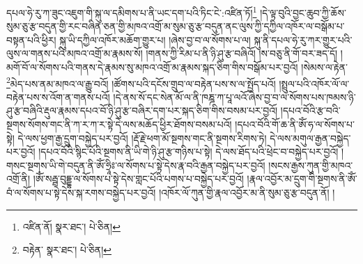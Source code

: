 དཔལ་ཧེ་རུ་ཀ་ཟུང་འཇུག་གི་སྐུ་ལ་དམིགས་པ་ནི་ཡང་དག་པའི་ཏིང་ངེ་:འཛིན་ཏོ།\footnote{འཛིན་ནོ།  སྣར་ཐང་།  པེ་ཅིན། } །དེ་ལྟ་བུའི་བྱང་ཆུབ་ཀྱི་ཆོས་སུམ་ཅུ་རྩ་བདུན་གྱི་རང་བཞིན་ཅན་གྱི་མཁའ་འགྲོ་མ་སུམ་ཅུ་རྩ་བདུན་ནང་ལུས་ཀྱི་དཀྱིལ་འཁོར་ལ་བསྒོམ་པ་བསྟན་པའི་ཕྱིར། སྐུ་ཡི་དཀྱིལ་འཁོར་མཆོག་གྱུར་པ། །ཞེས་བྱ་བ་ལ་སོགས་པ་ལ། སྐུ་ནི་དཔལ་ཧེ་རུ་ཀར་གྱུར་པའི་ལུས་ལ་གནས་པའི་མཁའ་འགྲོ་མ་རྣམས་སོ། །གནས་ཀྱི་རིམ་པ་ནི་ཉི་ཤུ་རྩ་བཞིའོ། །ས་བཅུ་ནི་གོ་བར་ཟད་དོ། །མགོ་བོ་ལ་སོགས་པའི་གནས་དེ་རྣམས་སུ་མཁའ་འགྲོ་མ་རྣམས་སྐད་ཅིག་གིས་བསྒོམ་པར་བྱའོ། །སེམས་ལ་རྟེན་\footnote{བརྟེན་  སྣར་ཐང་།  པེ་ཅིན། }མེད་པས་ནམ་མཁའ་ལ་རྒྱུ་བའོ། །ཚོགས་པའི་དངོས་གྲུབ་ལ་བརྟེན་པས་ས་ལ་སྤྱོད་པའོ། །སྤྲུལ་པའི་འཁོར་ལོ་ལ་བརྟེན་པས་ས་འོག་ན་གནས་པའོ། །དེ་ནས་སོ་དང་སེན་མོ་ལ་ནི་ཁཎྜ་ཀ་པཱ་ལའོ་ཞེས་བྱ་བ་ལ་སོགས་པས་ཁམས་ཉི་ཤུ་རྩ་བཞིའི་རྡུལ་རྣམས་དཔའ་བོ་ཉི་ཤུ་རྩ་བཞིར་དག་པར་སྐད་ཅིག་གིས་བསམ་པར་བྱའོ། །དཔའ་བོའི་རྩ་བའི་སྔགས་སོགས་གང་ནི་ཀ་ར་ཀ་ར་སྟེ་དེ་ལས་མཆོད་ཕྱིར་ཐོགས་བསམ་པའོ། །དཔའ་བོའི་གོ་ཆ་ནི་ཨོཾ་ཧ་ལ་སོགས་པ་སྟེ། དེ་ལས་ཕྱག་རྒྱ་དྲུག་བསྐྱེད་པར་བྱའོ། །རྡོ་རྗེ་ཕག་མོ་སྔགས་གང་ནི་སྔགས་རིགས་ཏེ། དེ་ལས་མགུལ་རྒྱན་བསྐྱེད་པར་བྱའོ། །དཔའ་བོའི་སྙིང་པོའི་སྔགས་ནི་ཡི་གེ་ཉི་ཤུ་རྩ་གཉིས་པ་སྟེ། དེ་ལས་ཐོད་པའི་ཕྲེང་བ་བསྐྱེད་པར་བྱའོ། །གསང་སྔགས་ཡི་གེ་བདུན་ནི་ཨོཾ་ཧྲཱིཿ་ལ་སོགས་པ་སྟེ་དེས་རྣ་བའི་རྒྱན་བསྐྱེད་པར་བྱའོ། །སངས་རྒྱས་ཀུན་གྱི་མཁའ་འགྲོ་ནི། །ཨོཾ་སརྦྦ་བུདྡྷ་ལ་སོགས་པ་སྟེ་དེས་གླང་པོའི་པགས་པ་བསྐྱེད་པར་བྱའོ། །རྣལ་འབྱོར་མ་དྲུག་གི་སྔགས་ནི་ཨོཾ་བཾ་ལ་སོགས་པ་སྟེ་དེས་སྐ་རགས་བསྐྱེད་པར་བྱའོ། །འཁོར་ལོ་ཀུན་གྱི་རྣལ་འབྱོར་མ་ནི་སུམ་ཅུ་རྩ་བདུན་ནོ། །
